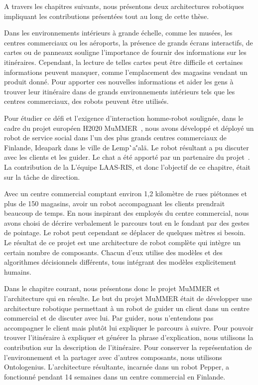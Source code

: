 A travers les chapitres suivants, nous présentons deux architectures robotiques impliquant les contributions présentées tout au long de cette thèse.

Dans les environnements intérieurs à grande échelle, comme les musées, les centres commerciaux ou les aéroports, la présence de grands écrans interactifs, de cartes ou de panneaux souligne l'importance de fournir des informations sur les itinéraires. Cependant, la lecture de telles cartes peut être difficile et certaines informations peuvent manquer, comme l'emplacement des magasins vendant un produit donné. Pour apporter ces nouvelles informations et aider les gens à trouver leur itinéraire dans de grands environnements intérieurs tels que les centres commerciaux, des robots peuvent être utilisés.

Pour étudier ce défi et l'exigence d'interaction homme-robot soulignée, dans le cadre du projet européen H2020 MuMMER~\cite{foster_2016_mummer}, nous avons développé et déployé un robot de service social dans l'un des plus grands centres commerciaux de Finlande, Ideapark dans le ville de Lemp\``a\''al\"a. Le robot résultant a pu discuter avec les clients et les guider. Le chat a été apporté par un partenaire du projet~\cite{papaioannou_2018_human}. La contribution de la L'équipe LAAS-RIS, et donc l'objectif de ce chapitre, était sur la tâche de direction.

Avec un centre commercial comptant environ 1,2 kilomètre de rues piétonnes et plus de 150 magasins, avoir un robot accompagnant les clients prendrait beaucoup de temps. En nous inspirant des employés du centre commercial, nous avons choisi de décrire verbalement le parcours tout en le fondant par des gestes de pointage. Le robot peut cependant se déplacer de quelques mètres si besoin.
Le résultat de ce projet est une architecture de robot complète qui intègre un certain nombre de composants. Chacun d'eux utilise des modèles et des algorithmes décisionnels différents, tous intégrant des modèles explicitement humains. 

Dans le chapitre courant, nous présentons donc le projet MuMMER et l'architecture qui en résulte. Le but du projet MuMMER était de développer une architecture robotique permettant à un robot de guider un client dans un centre commercial et de discuter avec lui. Par guider, nous n'entendons pas accompagner le client mais plutôt lui expliquer le parcours à suivre. Pour pouvoir trouver l'itinéraire à expliquer et générer la phrase d'explication, nous utilisons la contribution sur la description de l'itinéraire. Pour conserver la représentation de l'environnement et la partager avec d'autres composants, nous utilisons Ontologenius. L'architecture résultante, incarnée dans un robot Pepper, a fonctionné pendant 14 semaines dans un centre commercial en Finlande. 

